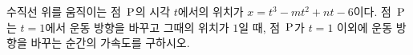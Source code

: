 수직선 위를 움직이는 점~$\mathrm{P}$의 시각 $t$에서의 위치가 $x=t^3-mt^2+nt-6$이다. 점~$\mathrm{P}$는 $t=1$에서 운동 방향을 바꾸고 그때의 위치가 $1$일 때, 점~$\mathrm{P}$가 $t=1$ 이외에 운동 방향을 바꾸는 순간의 가속도를 구하시오. 
